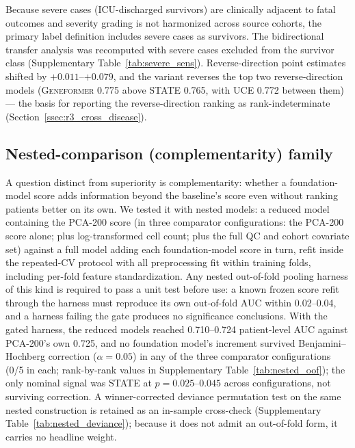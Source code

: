 \documentclass[11pt,a4paper]{article}
\newcommand{\model}[1]{\textsc{#1}}
\begin{document}
Because severe cases (ICU-discharged survivors) are clinically adjacent to
fatal outcomes and severity grading is not harmonized across source cohorts,
the primary label definition includes severe cases as survivors. The
bidirectional transfer analysis was recomputed with severe cases excluded
from the survivor class (Supplementary Table~\ref{tab:severe_sens}).
Reverse-direction point estimates shifted by $+0.011$--$+0.079$, and the
variant reverses the top two reverse-direction models (\model{Geneformer}
0.775 above \model{STATE} 0.765, with \model{UCE} 0.772 between them) ---
the basis for reporting the reverse-direction ranking as rank-indeterminate
(Section~\ref{ssec:r3_cross_disease}).

\subsection{Nested-comparison (complementarity) family}
\label{sn:nested_comparison}

A question distinct from superiority is complementarity: whether a
foundation-model score adds information beyond the baseline's score even
without ranking patients better on its own. We tested it with nested models:
a reduced model containing the PCA-200 score (in three comparator
configurations: the PCA-200 score alone; plus log-transformed cell count;
plus the full QC and cohort covariate set) against a full model adding each
foundation-model score in turn, refit inside the repeated-CV protocol with
all preprocessing fit within training folds, including per-fold feature
standardization. Any nested out-of-fold pooling harness of this kind is
required to pass a unit test before use: a known frozen score refit through
the harness must reproduce its own out-of-fold AUC within 0.02--0.04, and a
harness failing the gate produces no significance conclusions. With the gated
harness, the reduced models reached 0.710--0.724 patient-level AUC against
PCA-200's own 0.725, and no foundation model's increment survived
Benjamini--Hochberg correction ($\alpha = 0.05$) in any of the three
comparator configurations (0/5 in each; rank-by-rank values in Supplementary
Table~\ref{tab:nested_oof}); the only nominal signal was \model{STATE} at
$p = 0.025$--$0.045$ across configurations, not surviving correction. A
winner-corrected deviance permutation test on the same nested construction is
retained as an in-sample cross-check (Supplementary
Table~\ref{tab:nested_deviance}); because it does not admit an out-of-fold
form, it carries no headline weight.
\end{document}
